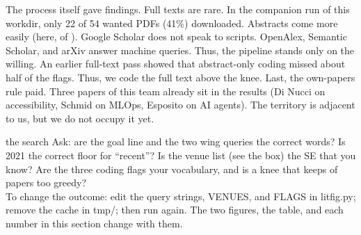 The process itself gave findings.
Full texts are rare.
In the companion run of this workdir, only 22 of 54 wanted PDFs (41\%)
downloaded.
Abstracts come more easily (here, \litAbs{} of \litRead).
Google Scholar does not speak to scripts.
OpenAlex, Semantic Scholar, and arXiv answer machine queries.
Thus, the pipeline stands only on the willing.
An earlier full-text pass showed that abstract-only coding missed
about half of the flags.
Thus, we code the full text above the knee.
Last, the own-papers rule paid.
Three papers of this team already sit in the results (Di Nucci on
accessibility, Schmid on MLOps, Esposito on AI agents).
The territory is adjacent to us, but we do not occupy it yet.

\begin{pause}{the search}
Ask: are the goal line and the two wing queries the correct words?
Is 2021 the correct floor for ``recent''?
Is the venue list (see the box) the SE that you know?
Are the three coding flags your vocabulary, and is a knee that keeps
\litKnee{} of \litSE{} papers too greedy?\\[0.2em] To change the
outcome: edit the query strings, {\ttfamily VENUES}, and {\ttfamily
FLAGS} in {\ttfamily litfig.py}; remove the cache in {\ttfamily tmp/};
then run again.
The two figures, the table, and each number in this section change
with them.
\end{pause}
